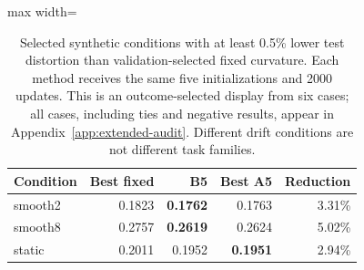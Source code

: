 \begin{table}[t]
\centering
\footnotesize\setlength{\tabcolsep}{4.2pt}\renewcommand{\arraystretch}{1.12}
\caption{Selected synthetic conditions with at least 0.5\% lower test distortion than validation-selected fixed curvature. Each method receives the same five initializations and 2000 updates. This is an outcome-selected display from six cases; all cases, including ties and negative results, appear in Appendix~\ref{app:extended-audit}. Different drift conditions are not different task families.}
\label{tab:revision-mechanism-focus}
\begin{adjustbox}{max width=\linewidth}
\begin{tabular}{lrrrr}
\toprule
Condition & Best fixed & B5 & Best A5 & Reduction \\
\midrule
smooth2 & 0.1823 & \cellcolor{oursbg}\textbf{0.1762} & 0.1763 & 3.31\% \\
smooth8 & 0.2757 & \cellcolor{oursbg}\textbf{0.2619} & 0.2624 & 5.02\% \\
static & 0.2011 & \cellcolor{oursbg}0.1952 & \textbf{0.1951} & 2.94\% \\
\bottomrule
\end{tabular}
\end{adjustbox}
\end{table}
